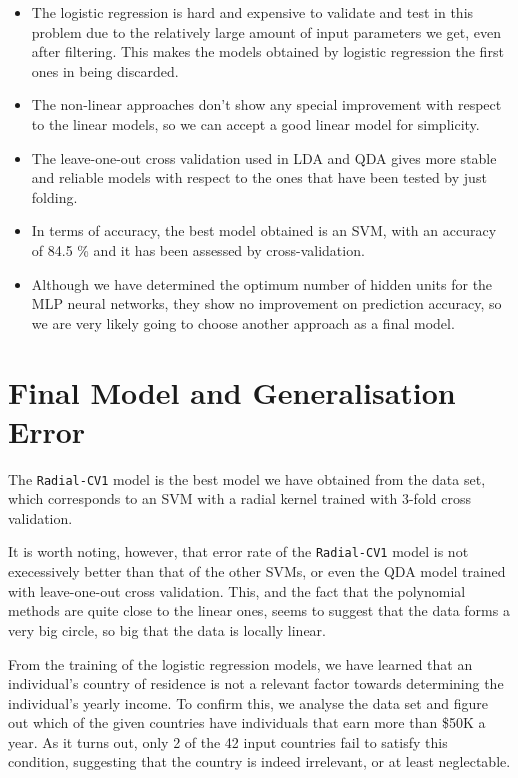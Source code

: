 \documentclass[english]{scrartcl}
\begin{document}
\begin{itemize}
\item The logistic regression is hard and expensive to validate and test in this 
problem due to the relatively large amount of input parameters we get, even after
filtering. This makes the models obtained by logistic regression the first ones 
in being discarded.

\item The non-linear approaches don't show any special improvement with respect
to the linear models, so we can accept a good linear model for simplicity.

\item The leave-one-out cross validation used in LDA and QDA gives more stable
and reliable models with respect to the ones that have been tested by just folding.

\item In terms of accuracy, the best model obtained is an SVM, with an accuracy
of 84.5 \% and it has been assessed by cross-validation.

\item Although we have determined the optimum number of hidden units for the 
MLP neural networks, they show no improvement on prediction accuracy, so we
are very likely going to choose another approach as a final model.
\end{itemize}

\section{Final Model and Generalisation Error}

The \texttt{Radial-CV1} model is the best model we have obtained from the data set, which corresponds to an SVM with a radial kernel trained with 3-fold cross validation. 

It is worth noting, however, that error rate of the \texttt{Radial-CV1} model is not execessively better than that of the other SVMs, or even the QDA model trained with leave-one-out cross validation. This, and the fact that the polynomial methods are quite close to the linear ones, seems to suggest that the data forms a very big circle, so big that the data is locally linear.

From the training of the logistic regression models, we have learned that an individual's country of residence is not a relevant factor towards determining the individual's yearly income. To confirm this, we analyse the data set and figure out which of the given countries have individuals that earn more than \$50K a year. As it turns out, only 2 of the 42 input countries fail to satisfy this condition, suggesting that the country is indeed irrelevant, or at least neglectable.
\end{document}
